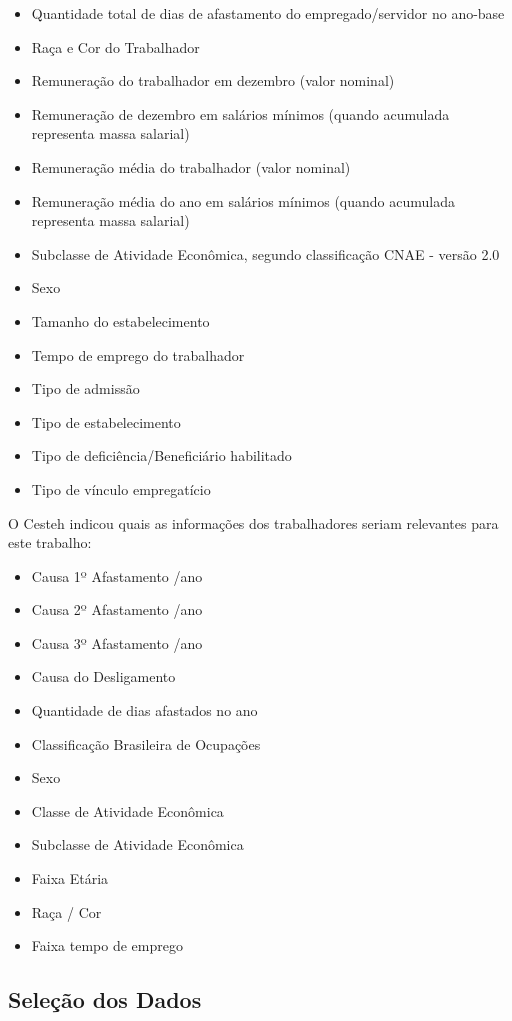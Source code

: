 \documentclass[12pt]{article}
\begin{document}
\begin{itemize}
\item Quantidade total de dias de afastamento do empregado/servidor no ano-base 
\item Raça e Cor do Trabalhador
\item Remuneração do trabalhador em dezembro (valor nominal) 
\item Remuneração de dezembro em salários mínimos (quando acumulada representa massa salarial)
\item Remuneração média do trabalhador (valor nominal)
\item Remuneração média do ano em salários mínimos (quando acumulada representa massa salarial)
\item Subclasse de Atividade Econômica, segundo classificação CNAE - versão 2.0
\item Sexo
\item Tamanho do estabelecimento
\item Tempo de emprego do trabalhador
\item Tipo de admissão
\item Tipo de estabelecimento
\item Tipo de deficiência/Beneficiário habilitado
\item Tipo de vínculo empregatício
\end{itemize}

O Cesteh indicou quais as informações dos trabalhadores seriam relevantes para este trabalho:

\begin{itemize}
    \item Causa 1º Afastamento /ano
    \item Causa 2º Afastamento /ano
    \item Causa 3º Afastamento /ano
    \item Causa do Desligamento
    \item Quantidade de dias afastados no ano
    \item Classificação Brasileira de Ocupações
    \item Sexo
    \item Classe de Atividade Econômica 
    \item Subclasse de Atividade Econômica
    \item Faixa Etária
    \item Raça / Cor
    \item Faixa tempo de emprego
\end{itemize}


\subsection{Seleção dos Dados}
\end{document}
